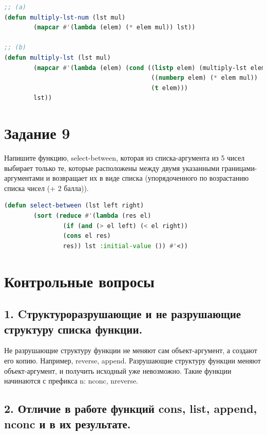 \documentclass[12pt]{report}
\begin{document}
\begin{lstlisting}[language=Lisp]    
;; (a)
(defun multiply-lst-num (lst mul)
		(mapcar #'(lambda (elem) (* elem mul)) lst))
	
;; (b)
(defun multiply-lst (lst mul)
		(mapcar #'(lambda (elem) (cond ((listp elem) (multiply-lst elem mul))
										((numberp elem) (* elem mul))
										(t elem)))
		lst))

\end{lstlisting}




\section*{Задание 9}
Напишите функцию, select-between, которая из списка-аргумента из 5 чисел выбирает только те, которые расположены между двумя указанными границами-аргументами и возвращает их в виде списка (упорядоченного по возрастанию списка чисел (+ 2 балла)).

\begin{lstlisting}[language=Lisp]
(defun select-between (lst left right)
		(sort (reduce #'(lambda (res el) 
				(if (and (> el left) (< el right))
				(cons el res)
				res)) lst :initial-value ()) #'<))
\end{lstlisting}


\section*{Контрольные вопросы}

\subsection*{1. Cтруктуроразрушающие и не разрушающие структуру списка функции.}

Не разрушающие структуру функции не меняют сам объект-аргумент, а создают его копию. Например, reverse, append.
Разрушающие структуру функции меняют объект-аргумент, и получить исходный уже невозможно. Такие функции начинаются с префикса n: nconc, nreverse. 


\subsection*{2. Отличие в работе функций cons, list, append, nconc и в их результате.}
\end{document}
